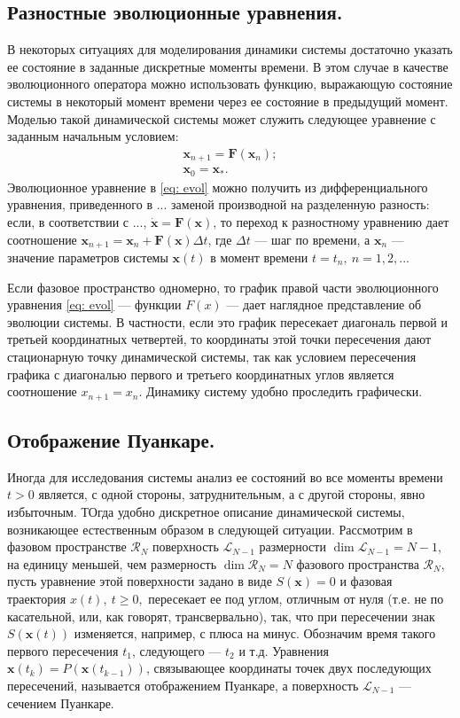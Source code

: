 \subsection{Разностные эволюционные уравнения.} В некоторых ситуациях для моделирования динамики системы достаточно указать ее состояние в заданные дискретные моменты времени. В этом случае в качестве эволюционного оператора можно использовать функцию, выражающую состояние системы в некоторый момент времени через ее состояние в предыдущий момент. Моделью такой динамической системы может служить следующее уравнение с заданным начальным условием:
\begin{equation}\label{eq: evol}
    \begin{split}
        \textbf{x}_{n+1} = \textbf{F}(\textbf{x}_{n});\\
        \textbf{x}_{0} = \textbf{x}_{*}.
    \end{split}
\end{equation}
Эволюционное уравнение в \eqref{eq: evol} можно получить из дифференциального уравнения, приведенного в ... заменой производной на разделенную разность: если, в соответствии с ..., $\dot{\textbf{x}} = \textbf{F}(\textbf{x})$, то переход к разностному уравнению дает соотношение $\textbf{x}_{n + 1} = \textbf{x}_{n} + \textbf{F}(\textbf{x}) \Delta t$, где $\Delta t$ --- шаг по времени, а $\textbf{x}_{n}$ --- значение параметров системы $\textbf{x}(t)$ в момент времени $t = t_{n}, \ n = 1, 2,...$

Если фазовое пространство одномерно, то график правой части эволюционного уравнения \eqref{eq: evol} --- функции $F(x)$ --- дает наглядное представление об эволюции системы. В частности, если это график пересекает диагональ первой и третьей координатных четвертей, то координаты этой точки пересечения дают стационарную точку динамической системы, так как условием пересечения графика с диагональю первого и третьего координатных углов является соотношение $x_{n+1} = x_{n}$. Динамику систему удобно проследить графически.
\subsection{Отображение Пуанкаре.} Иногда для исследования системы анализ ее состояний во все моменты времени $t > 0$ является, с одной стороны, затруднительным, а с другой стороны, явно избыточным. ТОгда удобно дискретное описание динамической системы, возникающее естественным образом в следующей ситуации. Рассмотрим в фазовом пространстве $\mathcal{R}_{N}$ поверхность $\mathcal{L}_{N-1}$ размерности $\dim{\mathcal{L}_{N-1}} = N - 1$, на единицу меньшей, чем размерность $\dim{\mathcal{R}_{N}} = N$ фазового пространства $\mathcal{R}_{N}$, пусть уравнение этой поверхности задано в виде $S(\textbf{x}) = 0$ и фазовая траектория $x(t), \ t \geq 0,$ пересекает ее под углом, отличным от нуля (т.е. не по касательной, или, как говорят, трансвервально), так, что при пересечении знак $S(\textbf{x}(t))$ изменяется, например, с плюса на минус. Обозначим время такого первого пересечения $t_{1}$, следующего --- $t_{2}$ и т.д. Уравнения $\textbf{x}(t_{k}) = P(\textbf{x}(t_{k-1}))$, связывающее координаты точек двух последующих пересечений, называется отображением Пуанкаре, а поверхность $\mathcal{L}_{N-1}$ --- сечением Пуанкаре.


